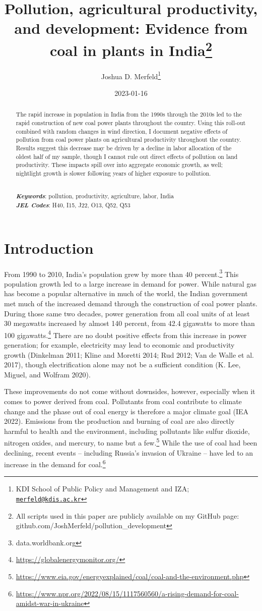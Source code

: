 \documentclass[
]{article}
\title{Pollution, agricultural productivity, and development: Evidence from coal in plants in India\footnote{All scripts used in this paper are publicly available on my GitHub page: github.com/JoshMerfeld/pollution\_development}}
\author{Joshua D. Merfeld\footnote{KDI School of Public Policy and Management and IZA; \href{mailto:merfeld@kdis.ac.kr}{\nolinkurl{merfeld@kdis.ac.kr}}}}
\date{2023-01-16}
\begin{document}
\maketitle
\begin{abstract}
\noindent The rapid increase in population in India from the 1990s through the 2010s led to the rapid construction of new coal power plants throughout the country. Using this roll-out combined with random changes in wind direction, I document negative effects of pollution from coal power plants on agricultural productivity throughout the country. Results suggest this decrease may be driven by a decline in labor allocation of the oldest half of my sample, though I cannot rule out direct effects of pollution on land productivity. These impacts spill over into aggregate economic growth, as well; nightlight growth is slower following years of higher exposure to pollution.\\
\strut \\
\textbf{\textit{Keywords}}: pollution, productivity, agriculture, labor, India\\
\textbf{\textit{JEL Codes}}: H40, I15, J22, O13, Q52, Q53
\end{abstract}

\newpage
\doublespacing

\hypertarget{introduction}{%
\section{Introduction}\label{introduction}}

From 1990 to 2010, India's population grew by more than 40 percent.\footnote{data.worldbank.org} This population growth led to a large increase in demand for power. While natural gas has become a popular alternative in much of the world, the Indian government met much of the increased demand through the construction of coal power plants. During those same two decades, power generation from all coal units of at least 30 megawatts increased by almost 140 percent, from 42.4 gigawatts to more than 100 gigawatts.\footnote{\url{https://globalenergymonitor.org/}} There are no doubt positive effects from this increase in power generation; for example, electricity may lead to economic and productivity growth (Dinkelman 2011; Kline and Moretti 2014; Rud 2012; Van de Walle et al. 2017), though electrification alone may not be a sufficient condition (K. Lee, Miguel, and Wolfram 2020).

These improvements do not come without downsides, however, especially when it comes to power derived from coal. Pollutants from coal contribute to climate change and the phase out of coal energy is therefore a major climate goal (IEA 2022). Emissions from the production and burning of coal are also directly harmful to health and the environment, including pollutants like sulfur dioxide, nitrogen oxides, and mercury, to name but a few.\footnote{\url{https://www.eia.gov/energyexplained/coal/coal-and-the-environment.php}} While the use of coal had been declining, recent events -- including Russia's invasion of Ukraine -- have led to an increase in the demand for coal.\footnote{\url{https://www.npr.org/2022/08/15/1117560560/a-rising-demand-for-coal-amidst-war-in-ukraine}}
\end{document}
